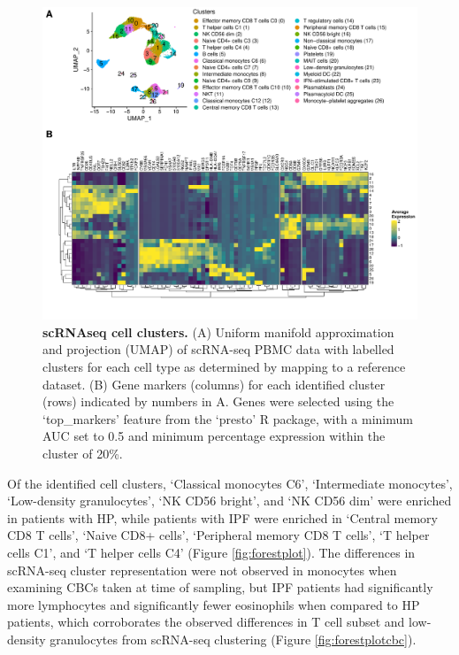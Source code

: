 \documentclass[
]{article}
\begin{document}
\begin{figure}
\includegraphics[width=1\linewidth,]{./Figures/scRNAseq/uamp_cluster_v1} \caption[scRNA-seq clusters]{\textbf{scRNAseq cell clusters.} (A) Uniform manifold approximation and projection (UMAP) of scRNA-seq PBMC data with labelled clusters for each cell type as determined by mapping to a reference dataset. (B) Gene markers (columns) for each identified cluster (rows) indicated by numbers in A. Genes were selected using the `top\_markers' feature from the `presto' R package, with a minimum AUC set to 0.5 and minimum percentage expression within the cluster of 20\%.}\label{fig:clustermarkers}
\end{figure}

Of the identified cell clusters, `Classical monocytes C6', `Intermediate monocytes', `Low-density granulocytes', `NK CD56 bright', and `NK CD56 dim' were enriched in patients with HP, while patients with IPF were enriched in `Central memory CD8 T cells', `Naive CD8+ cells', `Peripheral memory CD8 T cells', `T helper cells C1', and `T helper cells C4' (Figure \ref{fig:forestplot}). The differences in scRNA-seq cluster representation were not observed in monocytes when examining CBCs taken at time of sampling, but IPF patients had significantly more lymphocytes and significantly fewer eosinophils when compared to HP patients, which corroborates the observed differences in T cell subset and low-density granulocytes from scRNA-seq clustering (Figure \ref{fig:forestplotcbc}).
\end{document}

